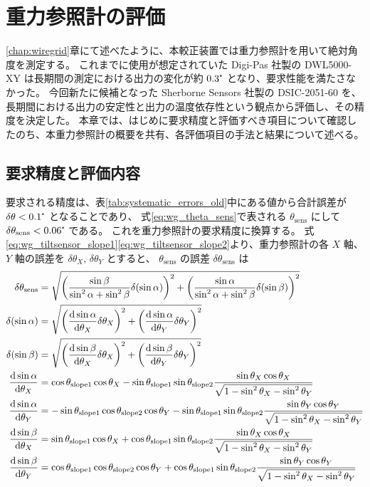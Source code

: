 \documentclass[../../main.tex]{subfiles}
\begin{document}
\chapter{重力参照計の評価}
\label{chap:tiltsensor}

\ref{chap:wiregrid}章にて述べたように、本較正装置では重力参照計を用いて絶対角度を測定する。
これまでに使用が想定されていた Digi-Pas 社製の DWL5000-XY は長期間の測定における出力の変化が約 $0.3\tcdegree$ となり、要求性能を満たさなかった。
今回新たに候補となった Sherborne Sensors 社製の DSIC-2051-60 を、長期間における出力の安定性と出力の温度依存性という観点から評価し、その精度を決定した。
本章では、はじめに要求精度と評価すべき項目について確認したのち、本重力参照計の概要を共有、各評価項目の手法と結果について述べる。
\section{要求精度と評価内容}
要求される精度は、表\ref{tab:systematic_errors_old}中にある値から合計誤差が $\delta\theta < 0.1\tcdegree$ となることであり、
式\eqref{eq:wg_theta_sens}で表される $\theta_{\mathrm{sens}}$ にして $\delta\theta_{\mathrm{sens}}<0.06\tcdegree$ である。
これを重力参照計の要求精度に換算する。
式\eqref{eq:wg_tiltsensor_slope1}\eqref{eq:wg_tiltsensor_slope2}より、重力参照計の各 $X$ 軸、$Y$ 軸の誤差を $\delta\theta_{X},\,\delta\theta_{Y}$ とすると、
$\theta_{\mathrm{sens}}$ の誤差 $\delta\theta_{\mathrm{sens}}$ は
\begin{align}
    \delta\theta_{\mathrm{sens}} &= 
        \sqrt{\qty(\dfrac{\sin\beta}{\sin^2\alpha+\sin^2\beta} \delta\qty(\sin\alpha))^2 + \qty(\dfrac{\sin\alpha}{\sin^2\alpha+\sin^2\beta} \delta\qty(\sin\beta))^2}\\ 
    \delta\qty(\sin\alpha) &= \sqrt{\qty(\dv{\sin\alpha}{\theta_X}\delta\theta_X)^2+\qty(\dv{\sin\alpha}{\theta_Y}\delta\theta_Y)^2}\\
    \delta\qty(\sin\beta) &= \sqrt{\qty(\dv{\sin\beta}{\theta_X}\delta\theta_X)^2+\qty(\dv{\sin\beta}{\theta_Y}\delta\theta_Y)^2} \\
    \dv{\sin\alpha}{\theta_X} &= \cos\theta_{\mathrm{slope}1}\cos\theta_X - \sin\theta_{\mathrm{slope}1}\sin\theta_{\mathrm{slope}2}\dfrac{\sin\theta_X\cos\theta_X}{\sqrt{1-\sin^2\theta_X-\sin^2\theta_Y}} \\
    \dv{\sin\alpha}{\theta_Y} &= -\sin\theta_{\mathrm{slope}1}\cos\theta_{\mathrm{slope}2}\cos\theta_Y - \sin\theta_{\mathrm{slope}1}\sin\theta_{\mathrm{slope}2}\dfrac{\sin\theta_Y\cos\theta_Y}{\sqrt{1-\sin^2\theta_X-\sin^2\theta_Y}} \\
    \dv{\sin\beta}{\theta_X} &= \sin\theta_{\mathrm{slope}1}\cos\theta_X + \cos\theta_{\mathrm{slope}1}\sin\theta_{\mathrm{slope}2}\dfrac{\sin\theta_X\cos\theta_X}{\sqrt{1-\sin^2\theta_X-\sin^2\theta_Y}} \\
    \dv{\sin\beta}{\theta_Y} &= \cos\theta_{\mathrm{slope}1}\cos\theta_{\mathrm{slope}2}\cos\theta_Y + \cos\theta_{\mathrm{slope}1}\sin\theta_{\mathrm{slope}2}\dfrac{\sin\theta_Y\cos\theta_Y}{\sqrt{1-\sin^2\theta_X-\sin^2\theta_Y}}
\end{align}
\end{document}
